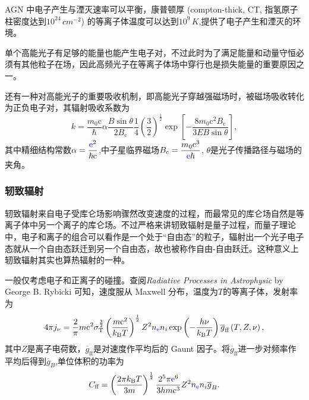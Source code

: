 \documentclass[../天体物理基础.tex]{subfiles}
\begin{document}
AGN 中电子产生与湮灭速率可以平衡，康普顿厚 (compton-thick, CT, 指氢原子柱密度达到$10^{24}\,\unit{cm^{-2}}$) 的等离子体温度可以达到$10^{9}\,\unit{K}$,提供了电子产生和湮灭的环境。

单个高能光子有足够的能量也能产生电子对，不过此时为了满足能量和动量守恒必须有其他粒子在场，因此高频光子在等离子体场中穿行也是损失能量的重要原因之一。

还有一种对高能光子的重要吸收机制，即高能光子穿越强磁场时，被磁场吸收转化为正负电子对，其辐射吸收系数为
\begin{equation}
k=\frac{m_{0}\mathrm{c}}{\hbar}\alpha\frac{B\sin\theta}{2B_\mathrm{c}}\frac{1}{4}\left(\frac{3}{2}\right)^{\frac{1}{2}}\exp\left[-\frac{8m_{0}\mathrm{c}^{2}B_\mathrm{c}}{3EB\sin\theta}\right],
\end{equation}
其中精细结构常数$\alpha=\dfrac{{\color{blue}{\ce{e}}}^{2}}{\hbar\mathrm{c}}$,中子星临界磁场$B_\mathrm{c}=\dfrac{m_{0}\mathrm{c}^{3}}{{\color{blue}{\ce{e}}}\hbar}$, $\theta$是光子传播路径与磁场的夹角。

\subsubsection{轫致辐射}
轫致辐射来自电子受库仑场影响骤然改变速度的过程，而最常见的库仑场自然是等离子体中另一个离子的库仑场。不过严格来讲轫致辐射是量子过程，而量子理论中，电子和离子的组合可以看作是一个处于“自由态”的粒子，辐射出一个光子电子态就从一个自由态跃迁到另一个自由态，故也被称作自由{}-{}自由跃迁。这种意义上轫致辐射其实也算热辐射的一种。

一般仅考虑电子和正离子的碰撞。查阅\textit{Radiative Processes in Astrophysic} by George B. Rybicki 可知，速度服从 Maxwell 分布，温度为$T$的等离子体，发射率为
\begin{equation}
4\pi j_{\nu}=\frac{2}{\pi}m\mathrm{c}^{2}\sigma_{\text{T}}^{\frac{3}{2}}\left(\frac{m\mathrm{c}^{2}}{k_{\text{B}}T}\right)^{\frac{1}{2}}Z^{2}n_{{\color{blue}{\ce{e}}}}n_{i}\exp\left(-\frac{h\nu}{k_{\text{B}}T}\right)\overline{g}_{\text{ff}}\left(T,Z,\nu\right),
\end{equation}
其中$Z$是离子电荷数，$\overline{g}_{\text{ff}}$是对速度作平均后的 Gaunt 因子。将$\overline{g}_{\text{ff}}$进一步对频率作平均后得到$\overline{g}_{B}$,单位体积的功率为
\begin{equation}
C_{\text{ff}}=\left(\frac{2\pi k_{\text{B}}T}{3m}\right)^{\frac{1}{2}}\frac{2^{5}\pi{\color{blue}{\ce{e}}}^{6}}{3hm\mathrm{c}^{3}}Z^{2}n_{{\color{blue}{\ce{e}}}}n_{i}\overline{g}_{B}.
\end{equation}
\end{document}
